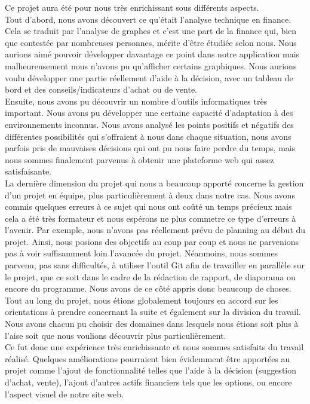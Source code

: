 Ce projet aura été pour nous très enrichissant sous différents aspects.\\

Tout d'abord, nous avons découvert ce qu'était l'analyse technique en finance. Cela se traduit par l'analyse de graphes et c'est une part de la finance qui, bien que contestée par nombreuses personnes, mérite d'être étudiée selon nous. Nous aurions aimé pouvoir développer davantage ce point dans notre application mais malheureusement nous n'avons pu qu'afficher certains graphiques. Nous aurions voulu développer une partie réellement d'aide à la décision, avec un tableau de bord et des conseils/indicateurs d'achat ou de vente.\\

Ensuite, nous avons pu découvrir un nombre d'outils informatiques très important. Nous avons pu développer une certaine capacité d'adaptation à des environnements inconnus. Nous avons analysé les points positifs et négatifs des différentes possibilités qui s'offraient à nous dans chaque situation, nous avons parfois pris de mauvaises décisions qui ont pu nous faire perdre du temps, mais nous sommes finalement parvenus à obtenir une plateforme web qui assez satisfaisante.\\

La dernière dimension du projet qui nous a beaucoup apporté concerne la gestion d'un projet en équipe, plus particulièrement à deux dans notre cas. Nous avons commis quelques erreurs à ce sujet qui nous ont coûté un temps précieux mais cela a été très formateur et nous espérons ne plus commetre ce type d'erreurs à l'avenir. Par exemple, nous n'avons pas réellement prévu de planning au début du projet. Ainsi, nous posions des objectifs au coup par coup et nous ne parvenions pas à voir suffisamment loin l'avancée du projet. Néanmoins, nous sommes parvenu, pas sans difficultés, à utiliser l'outil Git afin de travailler en parallèle sur le projet, que ce soit dans le cadre de la rédaction de rapport, de diaporama ou encore du programme. Nous avons de ce côté appris donc beaucoup de choses.\\

Tout au long du projet, nous étions globalement toujours en accord sur les orientations à prendre concernant la suite et également sur la division du travail. Nous avons chacun pu choisir des domaines dans lesquels nous étions soit plus à l'aise soit que nous voulions découvrir plus particulièrement.\\

Ce fut donc une expérience très enrichissante et nous sommes satisfaits du travail réalisé. Quelques améliorations pourraient bien évidemment être apportées au projet comme l'ajout de fonctionnalité telles que l'aide à la décision (suggestion d'achat, vente), l'ajout d'autres actifs financiers tels que les options, ou encore l'aspect visuel de notre site web.